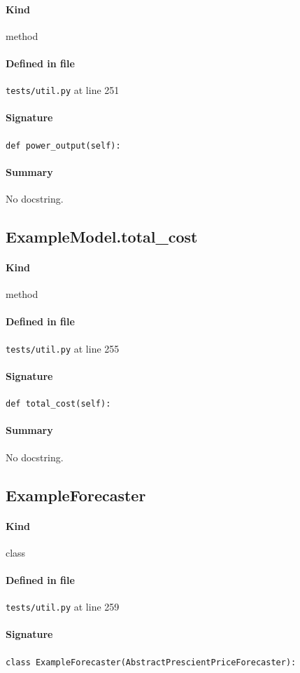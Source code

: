 \documentclass[11pt]{report}
\begin{document}
\paragraph{Kind} method
\paragraph{Defined in file} \texttt{tests/util.py} at line 251
\paragraph{Signature} \texttt{def power\_output(self):}
\paragraph{Summary} No docstring.
\subsection{ExampleModel.total\_cost}
\label{def:tests-util.py:ExampleModel.total_cost:L255}
\paragraph{Kind} method
\paragraph{Defined in file} \texttt{tests/util.py} at line 255
\paragraph{Signature} \texttt{def total\_cost(self):}
\paragraph{Summary} No docstring.
\subsection{ExampleForecaster}
\label{def:tests-util.py:ExampleForecaster:L259}
\paragraph{Kind} class
\paragraph{Defined in file} \texttt{tests/util.py} at line 259
\paragraph{Signature} \texttt{class ExampleForecaster(AbstractPrescientPriceForecaster):}
\end{document}
